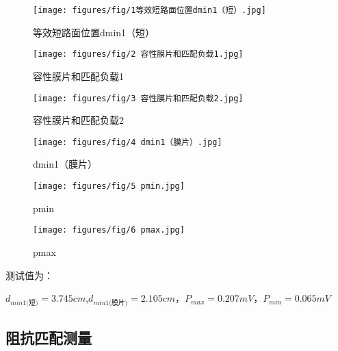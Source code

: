 \documentclass[12pt,hyperref,a4paper,UTF8]{ctexart}
\begin{document}
\begin{figure}[H]
    \centering
    \begin{minipage}{.33\textwidth}
        \centering
        \texttt{[image: figures/fig/1等效短路面位置dmin1（短）.jpg]}
        \caption{等效短路面位置dmin1（短）}
        \label{fig:dmin1}
    \end{minipage}%
    \begin{minipage}{.33\textwidth}
        \centering
        \texttt{[image: figures/fig/2 容性膜片和匹配负载1.jpg]}
        \caption{容性膜片和匹配负载1}
        \label{fig:dmin2}
    \end{minipage}%
    \begin{minipage}{.33\textwidth}
        \centering
        \texttt{[image: figures/fig/3 容性膜片和匹配负载2.jpg]}
        \caption{容性膜片和匹配负载2}
        \label{fig:0mv-image}
    \end{minipage}
\end{figure}


\begin{figure}[H]
    \centering
    \begin{minipage}{.33\textwidth}
        \centering
        \texttt{[image: figures/fig/4 dmin1（膜片）.jpg]}
        \caption{dmin1（膜片）}
        \label{fig:dmin1}
    \end{minipage}%
    \begin{minipage}{.33\textwidth}
        \centering
        \texttt{[image: figures/fig/5 pmin.jpg]}
        \caption{pmin}
        \label{fig:dmin2}
    \end{minipage}%
    \begin{minipage}{.33\textwidth}
        \centering
        \texttt{[image: figures/fig/6 pmax.jpg]}
        \caption{pmax}
        \label{fig:0mv-image}
    \end{minipage}
\end{figure}

测试值为：

$d_{min1\text{(短)}}=3.745cm$,$ d_{min1\text{(膜片)}}=2.105cm$，$P_{max}=0.207mV$，$P_{min}=0.065mV$


\subsection{阻抗匹配测量}
\end{document}
